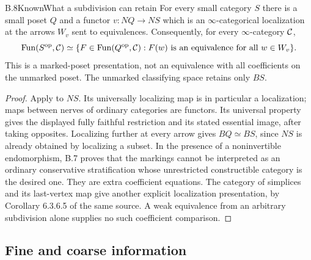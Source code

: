 \begin{statement}{B.8}{Known}{What a subdivision can retain}
For every small category $S$ there is a small poset $Q$ and a functor
$v:NQ\to NS$ which is an $\infty$-categorical localization at the
arrows $W_v$ sent to equivalences. Consequently, for every
$\infty$-category $\mathcal C$,
\[
 \operatorname{Fun}(S^{\mathrm{op}},\mathcal C)\simeq
 \{F\in\operatorname{Fun}(Q^{\mathrm{op}},\mathcal C):F(w)\text{ is an equivalence for all }w\in W_v\}.
\]
This is a marked-poset presentation, not an equivalence with all
coefficients on the unmarked poset. The unmarked classifying space
retains only $BS$.
\end{statement}
\begin{proof}
Apply \citet[Theorem 6.3.6.1]{KerodonSubdivision} to $NS$. Its universally
localizing map is in particular a localization; maps between nerves of
ordinary categories are functors. Its universal property gives the
displayed fully faithful restriction and its stated essential image,
after taking opposites. Localizing further at every arrow gives
$BQ\simeq BS$, since $NS$ is already obtained by localizing a subset.
In the presence of a noninvertible endomorphism, B.7 proves that the
markings cannot be interpreted as an ordinary conservative stratification
whose unrestricted constructible category is the desired one. They are
extra coefficient equations. The category of simplices and its
last-vertex map give another explicit localization presentation, by
Corollary 6.3.6.5 of the same source. A weak equivalence from an arbitrary
subdivision alone supplies no such coefficient comparison.
\end{proof}

\subsection{Fine and coarse information}

